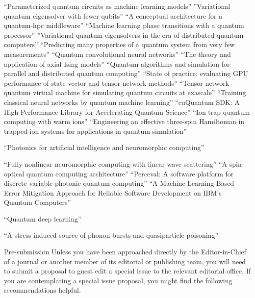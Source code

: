 \documentclass[]{article}
\begin{document}
\cite{Benedetti_2019}
``Parameterized quantum circuits as machine learning models''
\cite{PhysRevResearch.1.023025}
''Variational quantum eigensolver with fewer qubits''
\cite{saurabh2023conceptual}
``A conceptual architecture for a quantum-hpc middleware''
\cite{uvarov2020machine}
``Machine learning phase transitions with a quantum processor''
\cite{khait2023variational}
''Variational quantum eigensolvers in the era of distributed quantum computers''
\cite{huang2020predicting}
``Predicting many properties of a quantum system from very few measurements''
\cite{cong2019quantum}
``Quantum convolutional neural networks''
\cite{yeomans1988theory}
``The theory and application of axial Ising models''
\cite{parekh2021quantum}
``Quantum algorithms and simulation for parallel and distributed quantum computing''
\cite{vallero2024state}
``State of practice: evaluating GPU performance of state vector and tensor network methods''
\cite{nguyen2022tensor}
``Tensor network quantum virtual machine for simulating quantum circuits at exascale''
\cite{liu2024training}
``Training classical neural networks by quantum machine learning''
\cite{10313722}
``cuQuantum SDK: A High-Performance Library for Accelerating Quantum Science''
\cite{milburn2000ion}
``Ion trap quantum computing with warm ions''
\cite{Andrade_2022}
``Engineering an effective three-spin Hamiltonian in trapped-ion systems for applications in quantum simulation''

\cite{shastri2021photonics}
``Photonics for artificial intelligence and neuromorphic computing''

\cite{wanjura2024fully}
``Fully nonlinear neuromorphic computing with linear wave scattering''
\cite{de2024spin}
``A spin-optical quantum computing architecture''
\cite{heurtel2023perceval}
``Perceval: A software platform for discrete variable photonic quantum computing''
\cite{muqeet2024machine}
``A Machine Learning-Based Error Mitigation Approach for Reliable Software Development on IBM’s Quantum Computers''

\cite{wiebe2014quantum}
``Quantum deep learning''

\cite{anthony2024stress}
``A stress-induced source of phonon bursts and quasiparticle poisoning''

Pre-submission
Unless you have been approached directly by the Editor-in-Chief of a journal or another member of its editorial or publishing team, you will need to submit a proposal to guest edit a special issue to the relevant editorial office. If you are contemplating a special issue proposal, you might find the following recommendations helpful.
\end{document}
